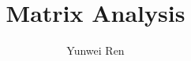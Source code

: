 

\title{Matrix Analysis}
\author{Yunwei Ren}
\date{}


\maketitle
\tableofcontents

\newpage

\newpage




